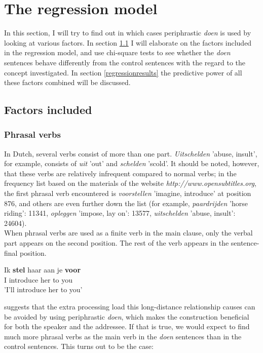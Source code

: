 \documentclass[12pt]{article}
\begin{document}
\section{The regression model} \label{regression}

In this section, I will try to find out in which cases periphrastic \emph{doen} is used by looking at various factors. In section \ref{factor} I will elaborate on the factors included in the regression model, and use chi-square tests to see whether the \emph{doen} sentences behave differently from the control sentences with the regard to the concept investigated. In section \ref{regressionresults} the predictive power of all these factors combined will be discussed.

\subsection{Factors included} \label{factor}

\subsubsection{Phrasal verbs}
In Dutch, several verbs consist of more than one part. \emph{Uitschelden} 'abuse, insult', for example, consists of \emph{uit} 'out' and \emph{schelden} 'scold'. It should be noted, however, that these verbs are relatively infrequent compared to normal verbs; in the frequency list based on the materials of the website \emph{http://www.opensubtitles.org}, the first phrasal verb encountered is \emph{voorstellen} 'imagine, introduce' at position 876, and others are even further down the list (for example, \emph{paardrijden} 'horse riding': 11341, \emph{opleggen} 'impose, lay on': 13577, \emph{uitschelden} 'abuse, insult': 24604).\\\indent
When phrasal verbs are used as a finite verb in the main clause, only the verbal part appears on the second position. The rest of the verb appears in the sentence-final position.

\begin{exe}
\ex \gll Ik \textbf{stel} haar aan je \textbf{voor}\\
I introduce her to you\\
'I'll introduce her to you'
\end{exe}

\citet[pp. 156]{n62} suggests that the extra processing load this long-distance relationship causes can be avoided by using periphrastic \emph{doen}, which makes the construction beneficial for both the speaker and the addressee. If that is true, we would expect to find much more phrasal verbs as the main verb in the \emph{doen} sentences than in the control sentences. This turns out to be the case:
\end{document}
